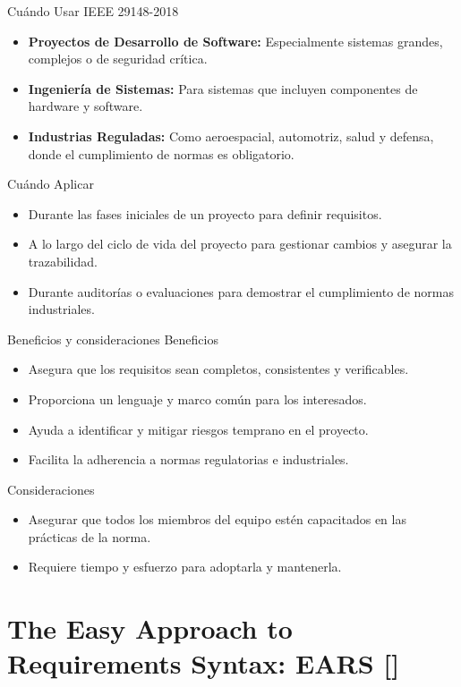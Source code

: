 \documentclass[
  24pt, %
  aspectratio=169, %
]{beamer}
\begin{document}
\begin{frame}{Cuándo Usar IEEE 29148-2018}
\begin{itemize}
    \item \textbf{Proyectos de Desarrollo de Software:} Especialmente sistemas grandes, complejos o de seguridad crítica.
    \item \textbf{Ingeniería de Sistemas:} Para sistemas que incluyen componentes de hardware y software.
    \item \textbf{Industrias Reguladas:} Como aeroespacial, automotriz, salud y defensa, donde el cumplimiento de normas es obligatorio.
\end{itemize}
\vspace{0.5cm}
Cuándo Aplicar
\begin{itemize}
    \item Durante las fases iniciales de un proyecto para definir requisitos.
    \item A lo largo del ciclo de vida del proyecto para gestionar cambios y asegurar la trazabilidad.
    \item Durante auditorías o evaluaciones para demostrar el cumplimiento de normas industriales.
\end{itemize}
\end{frame}

\begin{frame}{Beneficios y consideraciones}
Beneficios
\begin{itemize}
\item Asegura que los requisitos sean completos, consistentes y verificables.
\item Proporciona un lenguaje y marco común para los interesados.
\item Ayuda a identificar y mitigar riesgos temprano en el proyecto.
\item Facilita la adherencia a normas regulatorias e industriales.
\end{itemize}
Consideraciones
\begin{itemize}
\item Asegurar que todos los miembros del equipo estén capacitados en las prácticas de la norma.
\item Requiere tiempo y esfuerzo para adoptarla y mantenerla.
\end{itemize}
\end{frame}

\section{The Easy Approach to Requirements Syntax: EARS [\cite{ears}]}
\end{document}
